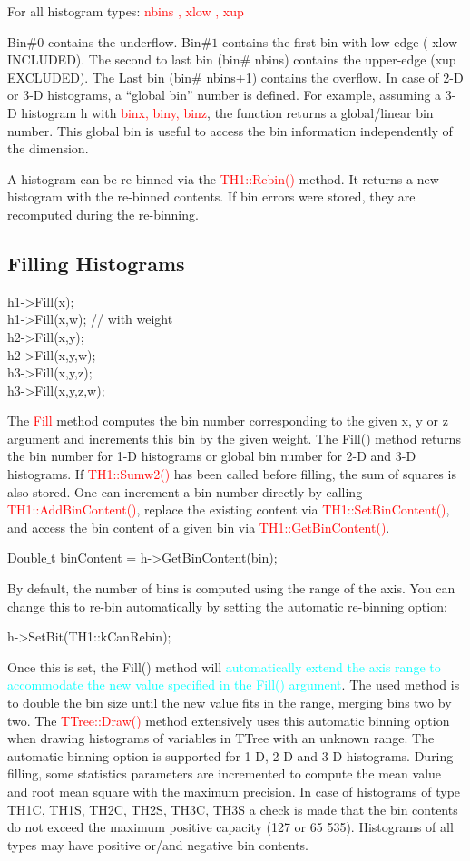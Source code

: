 \documentclass[12pt,a4paper]{article}
\begin{document}
For all histogram types: \textcolor{red}{nbins , xlow , xup}

Bin$\# 0$ contains the underflow. Bin$\# 1$ contains the first bin with low-edge ( xlow INCLUDED). The second to last bin (bin$\#$ nbins) contains the upper-edge (xup EXCLUDED). The Last bin (bin$\#$ nbins+1) contains the overflow. In case of 2-D or 3-D histograms, a ``global bin” number is defined. For example, assuming a 3-D histogram h with \textcolor{red}{binx, biny, binz}, the function returns a global/linear bin number. This global bin is useful to access the bin information independently of the dimension.

A histogram can be re-binned via the \textcolor{red}{TH1::Rebin()} method. It returns a new histogram with the re-binned contents. If bin errors were stored, they are recomputed during the re-binning.

\subsection{Filling Histograms}
h1->Fill(x); \\
h1->Fill(x,w); // with weight \\
h2->Fill(x,y); \\
h2->Fill(x,y,w); \\
h3->Fill(x,y,z); \\
h3->Fill(x,y,z,w);

The \textcolor{red}{Fill} method computes the bin number corresponding to the given x, y or z argument and increments this bin by the given weight. The Fill() method returns the bin number for 1-D histograms or global bin number for 2-D and 3-D histograms. If \textcolor{red}{TH1::Sumw2()} has been called before filling, the sum of squares is also stored. One can increment a bin number directly by calling  \textcolor{red}{TH1::AddBinContent()}, replace the existing content via  \textcolor{red}{TH1::SetBinContent()}, and access the bin content of a given bin via  \textcolor{red}{TH1::GetBinContent()}.

Double$\_$t binContent = h->GetBinContent(bin);

By default, the number of bins is computed using the range of the axis. You can change this to re-bin automatically by setting the automatic re-binning option:

h->SetBit(TH1::kCanRebin);

Once this is set, the Fill() method will \textcolor{cyan}{automatically extend the axis range to accommodate the new value specified in the Fill() argument}. The used method is to double the bin size until the new value fits in the range, merging bins two by two. The \textcolor{red}{TTree::Draw()} method extensively uses this automatic binning option when drawing histograms of variables in TTree with an unknown range. The automatic binning option is supported for 1-D, 2-D and 3-D histograms. During filling, some statistics parameters are incremented to compute the mean value and root mean square with the maximum precision. In case of histograms of type TH1C, TH1S, TH2C, TH2S, TH3C, TH3S a check is made that the bin contents do not exceed the maximum positive capacity (127 or 65 535). Histograms of all types may have positive or/and negative bin contents.
\end{document}

